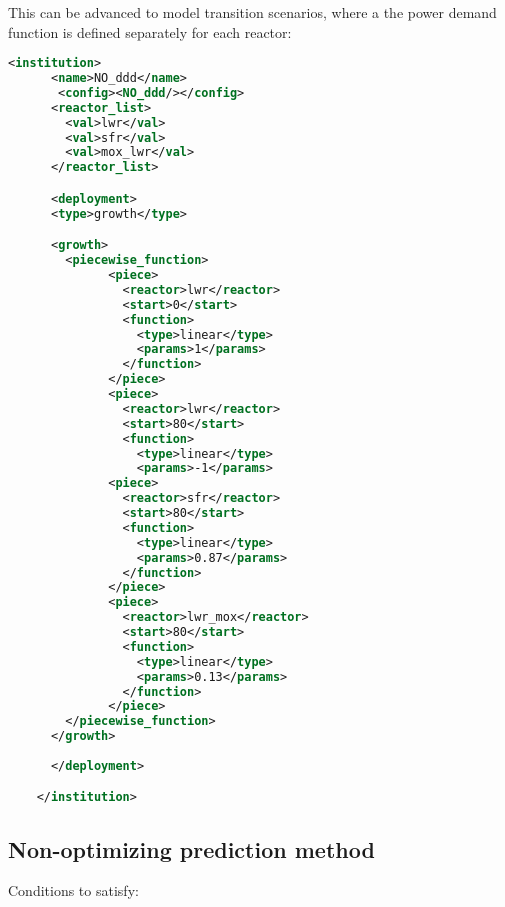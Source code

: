 \documentclass[12pt,letterpaper]{article}
\begin{document}
This can be advanced to model transition scenarios, where a the power demand
function is defined separately for each reactor:
\begin{lstlisting}[language=XML, caption=Reactor deployment input schema for EG30]
      <institution>
      <name>NO_ddd</name>
       <config><NO_ddd/></config>
      <reactor_list>
        <val>lwr</val>
        <val>sfr</val>
        <val>mox_lwr</val>
      </reactor_list>

      <deployment>
      <type>growth</type>

      <growth>
        <piecewise_function>
              <piece>
                <reactor>lwr</reactor>
                <start>0</start>
                <function>
                  <type>linear</type>
                  <params>1</params>
                </function>
              </piece>
              <piece>
                <reactor>lwr</reactor>
                <start>80</start>
                <function>
                  <type>linear</type>
                  <params>-1</params>
              <piece>
                <reactor>sfr</reactor>
                <start>80</start>
                <function>
                  <type>linear</type>
                  <params>0.87</params>
                </function>
              </piece>
              <piece>
                <reactor>lwr_mox</reactor>
                <start>80</start>
                <function>
                  <type>linear</type>
                  <params>0.13</params>
                </function>
              </piece>
        </piecewise_function>
      </growth>
      
      </deployment>

    </institution>
\end{lstlisting}

\subsection{Non-optimizing prediction method}
Conditions to satisfy: 
\end{document}
